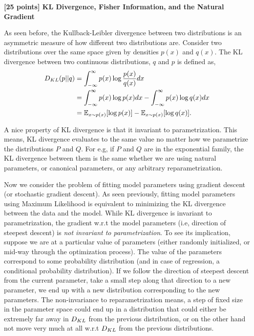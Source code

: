 \newcommand{\argminE}{\mathop{\mathrm{argmi\di}}\limits}          %
\newcommand{\argmaxE}{\mathop{\mathrm{argmax}}\limits}          %

\item {\bf [25 points] KL Divergence, Fisher Information, and the Natural Gradient}

As seen before, the Kullback-Leibler divergence between two distributions is an asymmetric measure of how different two distributions are. Consider two distributions over the same space given by densities $p(x)$ and $q(x)$. The KL divergence between two continuous distributions, $q$ and $p$ is defined as,
 \begin{align*}
D_{KL}(p||q)&=\int_{-\infty}^{\infty}p(x)\log\dfrac{p(x)}{q(x)}dx\\
&=\int_{-\infty}^{\infty}p(x)\log p(x)dx-\int_{-\infty}^{\infty}p(x)\log q(x)dx\\
&=\mathbb{E}_{x\sim p(x)}[\log p(x)]-\mathbb{E}_{x\sim p(x)}[\log q(x)].
\end{align*}


A nice property of KL divergence is that it invariant to parametrization. This means, KL divergence
evaluates to the same value no matter how we parametrize the distributions $P$ and $Q$. For e.g,
if $P$ and $Q$ are in the exponential family, the KL divergence between them is the same whether
we are using natural parameters, or canonical parameters, or any arbitrary reparametrization.


Now we consider the problem of fitting model parameters using gradient descent (or stochastic gradient
descent). As seen previously, fitting model parameters using Maximum Likelihood is equivalent
to minimizing the KL divergence between the data and the model. While KL divergence is
invariant to parametrization, the gradient w.r.t the model parameters (i.e, direction
of steepest descent) is \emph{not invariant to parametrization}. To see its implication, suppose
we are at a particular value of parameters (either randomly initialized, or mid-way through
the optimization process). The value of the parameters correspond to some probability distribution
(and in case of regression, a conditional probability distribution).
If we follow the direction of steepest descent from the current parameter, take a small step along that
direction to a new parameter, we end up with a new distribution corresponding to the new parameters.
The non-invariance to reparametrization means, a step of fixed size in the parameter space could
end up in a distribution that could either be extremely far away in $D_{KL}$ from the previous
distribution, or on the other hand not move very much at all w.r.t $D_{KL}$ from the previous
distributions.


